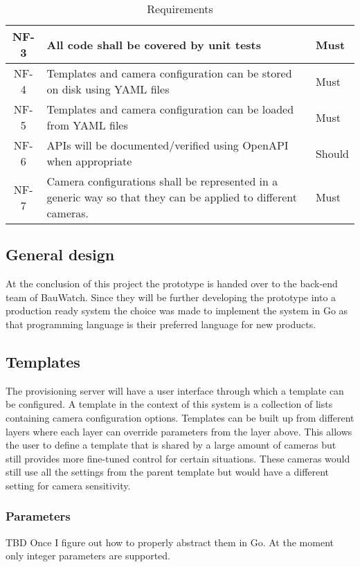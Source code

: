 \begin{table*}[h]
\begin{tabulary}{\linewidth}{CLL}
        \\ \hline
        NF-3 & All code shall be covered by unit tests & Must
        \\ \hline
        NF-4 & Templates and camera configuration can be stored on disk using YAML files & Must
        \\ \hline
        NF-5 & Templates and camera configuration can be loaded from YAML files & Must
        \\ \hline %
        NF-6 & APIs will be documented/verified using OpenAPI when appropriate & Should
        \\ \hline
        NF-7 & Camera configurations shall be represented in a generic way so that they can be applied to different cameras. & Must
    \end{tabulary}
    \caption{Requirements}
    \label{tab:requirements}
\end{table*}

\subsection{General design}
At the conclusion of this project the prototype is handed over to the back-end team of BauWatch.
Since they will be further developing the prototype into a production ready system the choice was made to implement the system in Go as that programming language is their preferred language for new products.

\subsection{Templates}
The provisioning server will have a user interface through which a template can be configured.
A template in the context of this system is a collection of lists containing camera configuration options.
Templates can be built up from different layers where each layer can override parameters from the layer above.
This allows the user to define a template that is shared by a large amount of cameras but still provides more fine-tuned control for certain situations.
These cameras would still use all the settings from the parent template but would have a different setting for camera sensitivity.

\subsubsection{Parameters}
TBD Once I figure out how to properly abstract them in Go.
At the moment only integer parameters are supported.


